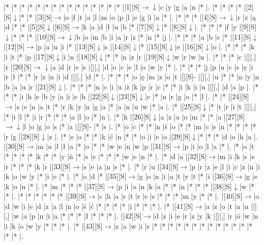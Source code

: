 \documentclass[11pt]{article}
\newcommand\drarr{$\rightarrow \!\!\!\!\! \downarrow$}
\newcommand\rarr{$\rightarrow$}
\newcommand\darr{$\downarrow$}
\begin{document}
\noindent\begin{Puzzle}{21}{26}|*	|*	|*	|*	|*	|*	|*	|*	|*	|*	|*	|*	|*	|*	|*	|[1][S]\drarr	|c	|y	|g	|a	|n	|*	|.
|*	|*	|*	|*	|[2][S]\darr	|*	|*	|[3][S]\rarr	|o	|f	|t	|a	|l	|m	|o	|p	|l	|e	|g	|i	|a	|*	|.
|*	|*	|*	|[4][S]\drarr	|r	|z	|ą	|d	|*	|*	|[5][S]\darr	|[6][S]\rarr	|k	|a	|d	|ł	|u	|b	|*	|[7][S]\darr	|*	|[8][S]\darr	|.
|*	|*	|*	|f	|y	|[9][S]\darr	|*	|*	|*	|[10][S]\drarr	|b	|o	|m	|b	|i	|a	|r	|z	|*	|n	|*	|j	|.
|*	|*	|*	|a	|b	|s	|*	|[11][S]\darr	|[12][S]\rarr	|p	|a	|n	|i	|*	|[13][S]\darr	|s	|[14][S]\darr	|*	|[15][S]\darr	|e	|[16][S]\darr	|o	|.
|*	|*	|*	|k	|i	|t	|*	|p	|[17][S]\darr	|i	|n	|[18][S]\darr	|*	|*	|n	|z	|r	|[19][S]\darr	|w	|r	|w	|n	|.
|*	|*	|*	|c	|[][,]{ }	|r	|[20][S]\drarr	|a	|d	|r	|e	|s	|[][,]{ }	|d	|o	|c	|e	|l	|o	|w	|y	|*	|.
|*	|*	|*	|j	|p	|u	|c	|s	|ę	|i	|r	|ł	|*	|*	|r	|z	|n	|i	|d	|[][,]{ }	|d	|*	|.
|*	|*	|*	|o	|ę	|m	|z	|o	|t	|[][S]-	|[][,]{ }	|u	|*	|*	|n	|y	|n	|b	|a	|u	|r	|[21][S]\darr	|.
|*	|*	|*	|n	|c	|i	|u	|ż	|k	|p	|r	|c	|*	|*	|i	|k	|i	|u	|[][,]{ }	|d	|a	|p	|.
|*	|*	|*	|i	|h	|e	|b	|y	|a	|i	|e	|h	|[22][S]\darr	|[23][S]\darr	|c	|*	|n	|r	|g	|o	|*	|l	|.
|*	|*	|[24][S]\rarr	|s	|e	|n	|a	|t	|*	|r	|k	|y	|n	|g	|a	|*	|a	|n	|u	|w	|*	|a	|.
|*	|[25][S]\darr	|*	|t	|r	|i	|t	|[][,]{ }	|*	|i	|l	|*	|i	|r	|*	|*	|*	|a	|l	|o	|*	|n	|.
|*	|k	|[26][S]\darr	|a	|z	|a	|o	|m	|*	|*	|a	|[27][S]\drarr	|l	|o	|g	|o	|s	|*	|a	|[][S]-	|*	|s	|.
|*	|o	|c	|*	|*	|n	|ś	|o	|*	|*	|m	|c	|s	|n	|*	|*	|*	|*	|r	|g	|[28][S]\darr	|z	|.
|*	|s	|o	|*	|*	|k	|ć	|n	|*	|*	|o	|i	|e	|o	|[29][S]\darr	|*	|*	|*	|d	|o	|h	|a	|.
|[30][S]\rarr	|m	|u	|ł	|ł	|a	|*	|o	|*	|*	|w	|e	|n	|w	|p	|[31][S]\rarr	|p	|i	|o	|l	|a	|*	|.
|*	|o	|t	|*	|*	|*	|*	|k	|*	|*	|y	|ń	|*	|s	|e	|*	|*	|*	|w	|e	|n	|*	|.
|*	|d	|a	|[32][S]\rarr	|m	|i	|k	|s	|e	|r	|*	|*	|*	|k	|r	|[33][S]\rarr	|s	|e	|a	|n	|s	|*	|.
|*	|r	|u	|[34][S]\rarr	|p	|r	|z	|e	|l	|i	|c	|z	|n	|i	|k	|o	|w	|y	|*	|i	|e	|*	|.
|*	|o	|d	|*	|[35][S]\rarr	|g	|o	|n	|i	|a	|t	|y	|t	|*	|i	|[36][S]\rarr	|g	|e	|k	|o	|n	|*	|.
|*	|m	|*	|*	|*	|[37][S]\rarr	|p	|i	|a	|n	|k	|a	|*	|*	|n	|*	|*	|*	|[38][S]\darr	|w	|*	|*	|.
|*	|*	|*	|*	|*	|*	|[39][S]\rarr	|c	|h	|a	|r	|t	|r	|e	|s	|*	|*	|*	|m	|y	|*	|*	|.
|[40][S]\rarr	|o	|d	|w	|i	|e	|d	|z	|a	|l	|n	|o	|ś	|ć	|*	|*	|*	|*	|i	|*	|*	|*	|.
|*	|[41][S]\rarr	|a	|z	|o	|t	|a	|n	|[][,]{ }	|w	|a	|p	|n	|i	|a	|*	|*	|*	|ł	|*	|*	|*	|.
|[42][S]\rarr	|d	|z	|i	|e	|r	|z	|y	|k	|[][,]{ }	|r	|ó	|w	|n	|i	|k	|o	|w	|y	|*	|*	|*	|.
|*	|[43][S]\rarr	|z	|a	|w	|i	|s	|*	|*	|*	|*	|*	|*	|*	|*	|*	|*	|*	|*	|*	|*	|*	|.\end{Puzzle}

\newpage
\end{document}
